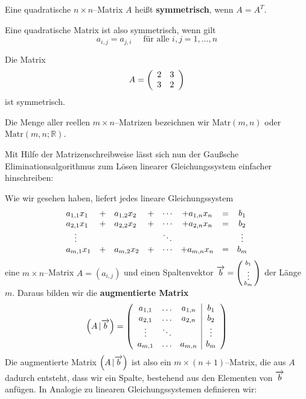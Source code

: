 \bigbreak

\begin{definition} Eine quadratische $n \times n$--Matrix $A$ heißt 
\textbf{symmetrisch}, wenn $A = A^T$.
\end{definition}

\begin{notiz} Eine quadratische Matrix ist also symmetrisch, wenn gilt
  $$ a_{i,j} = a_{j,i} \quad \textrm{ für alle } i, j = 1, \ldots, n $$
\end{notiz}

\begin{beispiel} Die Matrix 
  $$ A = \left( \begin{array} {l l} 2 & 3 \\ 3 & 2 \end{array} \right) $$
ist symmetrisch. 
\end{beispiel}

 Die Menge aller reellen $m \times n$--Matrizen bezeichnen wir $\textrm{Matr}(m,n)$ 
oder $\textrm{Matr}(m,n; \mathbb R)$.

\bigbreak

Mit Hilfe der Matrizenschreibweise lässt sich nun der Gaußsche Eliminationsalgorithmus zum Lösen 
linearer Gleichungssystem einfacher hinschreiben:

Wie wir gesehen haben, liefert jedes lineare Gleichungssystem
  $$ \begin{array} {l c l c c c l c l }
  a_{1,1} x_1 & + & a_{1,2} x_2 & + & \cdots & + a_{1,n} x_n & = & b_1 \\
  a_{2,1} x_1 & + & a_{2,2} x_2 & + & \cdots & + a_{2,n} x_n & = & b_2 \\
  \quad \vdots & & & & \ddots & & & \vdots \\
  a_{m,1} x_1 & + & a_{m,2} x_2 & + & \cdots & + a_{m,n} x_n & = & b_m 
  \end{array} $$
eine $m \times n$--Matrix $A = \left(a_{i,j}\right)$ und einen Spaltenvektor $\overrightarrow{b} 
= \left( \begin{smallmatrix} b_1 \\ \vdots \\ b_m \end{smallmatrix} \right)$ der Länge $m$. Daraus bilden 
wir die \textbf{augmentierte Matrix}
  	$$\left(A \, \vert \overrightarrow{b}\right) = \left( \begin{array}  {c c c | c}
    	a_{1,1} & \ldots & a_{1,n}   & b_1 \\
    	a_{2,1} & \ldots & a_{2,n} & b_2 \\
    	\vdots & \ddots & &  \vdots  \\
    	a_{m,1} & \ldots & a_{m,n} &  b_m
    	\end{array} \right) $$
Die augmentierte Matrix $\left(A \, \vert \overrightarrow{b}\right)$ ist also ein $m \times (n+1)$--Matrix, 
die aus $A$ dadurch entsteht, dass wir ein Spalte, bestehend aus den Elementen von 
$\overrightarrow{b}$ anfügen. In Analogie zu linearen Gleichungssystemen definieren wir:

